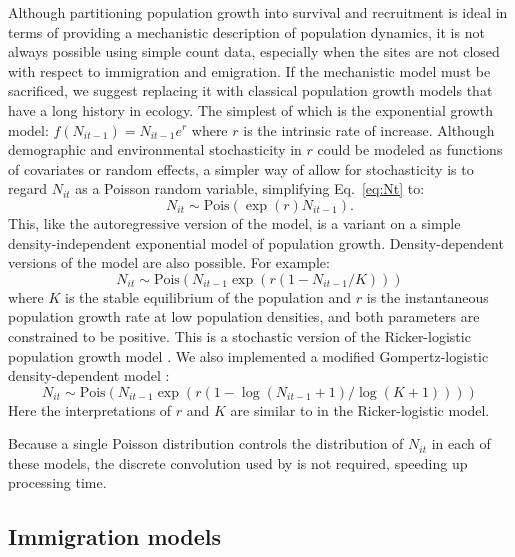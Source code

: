 \documentclass[12pt]{article}
\begin{document}
Although partitioning population growth into survival and recruitment
is ideal in terms of providing a mechanistic description of population
dynamics, it is not always possible using simple count data,
especially when the sites are not closed with respect to immigration
and emigration. %
If the mechanistic model must be sacrificed, we suggest replacing it
with classical population growth models that have a long history in
ecology. The simplest of which is the exponential growth
model: $f(N_{it-1}) = N_{it-1}e^r$ where $r$ is the intrinsic
rate of increase. Although demographic and environmental stochasticity
in $r$ could be modeled as functions of covariates or random effects, a
simpler way of allow for stochasticity is to regard $N_{it}$ as a Poisson random variable, simplifying
Eq.~\ref{eq:Nt} to:
\begin{equation}
  N_{it} \sim \text{Pois}(\exp(r)N_{it-1}).
\label{eq:exp}
\end{equation}
This,
like the autoregressive version of the model, is a variant on a simple
density-independent exponential model of population growth.
Density-dependent versions of the model are also possible.  For
example:
\begin{equation}
  N_{it} \sim \text{Pois}(N_{it-1}\exp(r(1-N_{it-1}/K)))
\label{eq:rick}
\end{equation}
where $K$ is the stable equilibrium of the population and $r$ is
the
instantaneous population growth rate at low population
densities, and
both parameters are constrained to be positive. This is a
stochastic version
of the Ricker-logistic population growth model
\citep{ricker:1954}. We also
implemented a modified Gompertz-logistic density-dependent
model \citep{hart_gotelli:2011}:
\begin{equation}
N_{it} \sim
\text{Pois}(N_{it-1}\exp(r(1-\log(N_{it-1}+1)/\log(K+1))))
\label{eq:gomp}
\end{equation}
Here the interpretations of $r$ and $K$ are similar to in the
Ricker-logistic model.

Because a single Poisson distribution controls the
distribution of $N_{it}$ in each of these models, the discrete
convolution used by \citet{dail_madsen:2011} is not required,
speeding up processing time.



\subsection{Immigration models}
\end{document}
